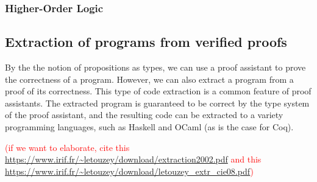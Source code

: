 \subsubsection{Higher-Order Logic}

\subsection{Extraction of programs from verified proofs}

By the the notion of propositions as types, we can use a proof assistant to
prove the correctness of a program. However, we can also extract a program from
a proof of its correctness. This type of code extraction is a common feature of proof assistants.
The extracted program is guaranteed to be correct by the type system of the proof assistant,
and the resulting code can be extracted to a variety programming languages, such as Haskell and OCaml (as is the case for Coq).
\cite{cintro}


\textcolor{red}{(if we want to elaborate, cite this \url{https://www.irif.fr/~letouzey/download/extraction2002.pdf} and this \url{https://www.irif.fr/~letouzey/download/letouzey_extr_cie08.pdf})}
